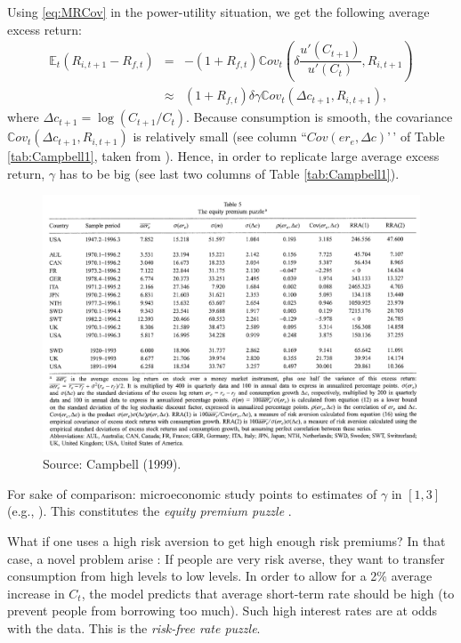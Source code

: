 \documentclass[
  12pt,
]{book}
\theoremstyle{definition}
\theoremstyle{definition}
\theoremstyle{definition}
\theoremstyle{definition}
\theoremstyle{remark}
\begin{document}
Using \eqref{eq:MRCov} in the power-utility situation, we get the following average excess return:
\begin{eqnarray*}
\mathbb{E}_t(R_{i,t+1} - R_{f,t}) &=& - (1 + R_{f,t}) \mathbb{C}ov_t\left(\delta \dfrac{u'(C_{t+1})}{u'(C_{t})},R_{i,t+1}\right)\\
&\approx& (1 + R_{f,t}) \delta \gamma  \mathbb{C}ov_t\left(\Delta c_{t+1},R_{i,t+1}\right),
\end{eqnarray*}
where \(\Delta c_{t+1} = \log(C_{t+1}/C_t)\).
Because consumption is smooth, the covariance \(\mathbb{C}ov_t\left(\Delta c_{t+1},R_{i,t+1}\right)\) is relatively small (see column ``\(Cov(er_e,\Delta c)\)'\,' of Table \ref{tab:Campbell1}, taken from \citet{Campbell_1999}).
Hence, in order to replicate large average excess return, \(\gamma\) has to be big (see last two columns of Table \ref{tab:Campbell1}).

\begin{figure}

{\centering \includegraphics[width=1\linewidth]{figures/table_campbell1999_eqpuzzle} 

}

\caption{Source: Campbell (1999).}\label{fig:Campbell1}
\end{figure}

For sake of comparison: microeconomic study points to estimates of \(\gamma\) in \([1,3]\) (e.g., \citet{Hartley_Lanot_Walker_2014}). This constitutes the \emph{equity premium puzzle} \citep{Mehra_Prescott_1985}.

What if one uses a high risk aversion to get high enough risk premiums? In that case, a novel problem arise \citep{Kandel_Stambaugh_1991}: If people are very risk averse, they want to transfer consumption from high levels to low levels.
In order to allow for a 2\% average increase in \(C_t\), the model predicts that average short-term rate should be high (to prevent people from borrowing too much). Such high interest rates are at odds with the data. This is the \emph{risk-free rate puzzle}.
\end{document}
